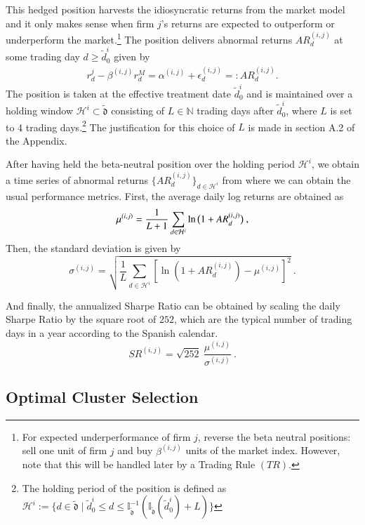\mx
This hedged position harvests the idiosyncratic returns from the market model and it only makes sense when firm $j$'s returns are expected to outperform or underperform the market.\footnote{
For expected underperformance of firm $j$, reverse the beta neutral positions: 
sell one unit of firm $j$ and buy $\beta^{(i,j)}$ units of the market index. However, note that this will be handled later by a Trading Rule $(TR)$.
\mx 
}
The position delivers abnormal returns $AR^{(i,j)}_{d}$ at some trading day $d\geq \tilde{d}_0^i$ given by
\begin{align*}
r_{d}^j -  \beta^{(i,j)} r_{d}^M = \alpha^{(i,j)} + \epsilon_{d}^{(i,j)} =: AR^{(i,j)}_{d}
.
\end{align*}
The position is taken at the effective treatment date $\tilde d_0^i$ and is maintained over a holding window $\mathcal H^i \subset \tilde{\mathfrak{d}}$ consisting of $L\in\mathbb{N}$ trading days after $\tilde d_0^i$, where $L$ is set to 4 trading days.\footnote{  
The holding period of the position is defined as 
$
\mathcal H^i:=
\{
d \in \tilde{\mathfrak{d}}
\mid 
\tilde{d}_0^i
\leq d \leq 
\mathbb{I}^{-1}_{\tilde{\mathfrak{d}}}(\mathbb{I}_{\tilde{\mathfrak{d}}}(\tilde d_0^i)+L)
\}
$}
The justification for this choice of $L$ is made in section A.2 of the Appendix. 

\mx 

After having held the beta-neutral position over the holding period $\mathcal H^i$, we obtain a time series of abnormal returns $\{AR_{d}^{(i,j)}\}_{d\in\mathcal H^i}$ from where we can obtain the usual performance metrics. First, the average daily log returns are obtained as
$$
\mu^{(i,j)} = \frac{1}{{{L}}+1} 
\sum_{d\in \mathcal H^i}
\ln\big{(} 1+AR_d^{(i,j)} \big{)}
~,
$$
Then, the standard deviation is given by
$$
\sigma^{(i,j)}
=
\sqrt{
\frac{1}{{{L}}}
\sum_{d\in \mathcal H^i}
[
\ln(1+AR_d^{(i,j)}) - \mu^{(i,j)}
]
^2}
~.
$$

\mx 
And finally, the annualized Sharpe Ratio can be obtained by scaling the daily Sharpe Ratio by the square root of ${252}$, which are the typical number of trading days in a year according to the Spanish calendar. 
$$
SR^{(i,j)} =
\sqrt{252}~
\frac{
\mu^{(i,j)}
}{
\sigma^{(i,j)}
}
~.
$$
\subsection{Optimal Cluster Selection}

